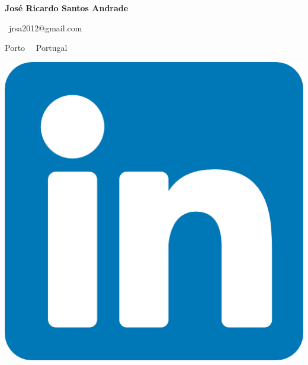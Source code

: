 \documentclass{mycv}
\begin{document}
\begin{center}
	{\LARGE\textbf{José Ricardo Santos Andrade}} \\
	\vspace{0.2cm}	
	
	\ jrsa2012@gmail.com
	
	
	
	\vspace{0.2cm}	
	
		Porto~\textbullet 
	\ Portugal

\end{center}

\begin{center}
	\vspace{0.4cm}
	
	\href{https://www.linkedin.com/in/jrsa2012}{\includegraphics[scale=0.065]{figs/linkedin_logo.png}}
	\ \ \ \ \ \ \ \ \ \

\end{center}
\end{document}
